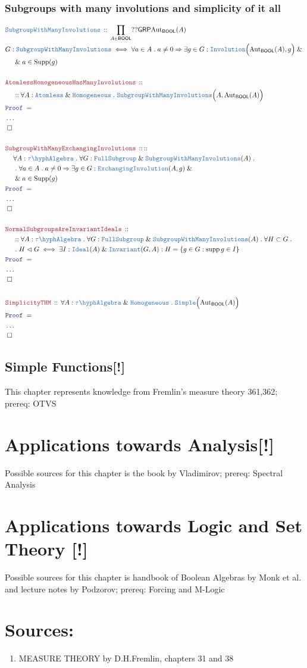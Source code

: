 \documentclass[12pt]{scrartcl}
\newcommand{\TYPE}[1]{\textcolor{NavyBlue}{\mathtt{#1}}}
\newcommand{\LOGIC}[1]{\textcolor{Blue}{\mathtt{#1}}}
\newcommand{\THM}[1]{\textcolor{Maroon}{\mathtt{#1}}}
\renewcommand{\.}{\; . \;}
\newcommand{\Theorem}[2]{& \THM{#1} \, :: \, #2 \\ & \Proof = \\ }
\newcommand{\DeclareType}[2]{& \TYPE{#1} \, :: \, #2 \\}
\newcommand{\DefineType}[3]{& #1 : \TYPE{#2} \iff #3 \\}
\newcommand{\NewLine}{\\ & \kern 1pc}
\newcommand{\Page}[1]{ \begin{align*} #1 \end{align*}   }
\newcommand{\NoProof}{ & \ldots \\ \EndProof}
\renewcommand{\And}{\; \& \;}
\newcommand{\Imply}{\Rightarrow}
\DeclareMathOperator*{\supp}{supp}
\newcommand{\Aut}{\mathrm{Aut}}
\newcommand{\QED}{\; \square}
\newcommand{\EndProof}{& \QED \\}
\newcommand{\Proof}{\LOGIC{Proof} \; }
\newcommand{\Ideal}{\TYPE{Ideal}}
\newcommand{\Nrml}{\vartriangleleft}
\newcommand{\GRP}{\mathsf{GRP}}
\newcommand{\TAlgebra}{\TYPE{\tau\hyph Algebra}}
\newcommand{\Aless}{\TYPE{Atomless}}
\newcommand{\Homog}{\TYPE{Homogeneous}}
\newcommand{\FS}{\TYPE{FullSubgroup}}
\newcommand{\EI}{\TYPE{ExchangingInvolution}}
\newcommand{\SwmI}{\TYPE{SubgroupWithManyInvolutions}}
\DeclareMathOperator{\Supp}{Supp}
\newcommand{\BOOL}{\mathsf{BOOL}}
\begin{document}
\subsubsection{Subgroups with many involutions and simplicity of it all}
\Page{
	\DeclareType{\SwmI}{\prod_{A \in \BOOL} ??\GRP \Aut_\BOOL(A)}
	\DefineType{G}{\SwmI}{
		\forall a \in A \. a \neq 0
		\Imply
		\exists g \in G :
		\TYPE{Involution}\Big(\Aut_\BOOL(A), g \Big) 
		\And \NewLine		
		\And a \in \Supp(g)
	}
	\\
	\Theorem{AtomlessHomogeneousHasManyInvolutions}{
		\NewLine ::		
		\forall A : \Aless \And \Homog \.
		\SwmI\Big(A,\Aut_\BOOL(A)	\Big)
	}
	\NoProof
	\\
	\Theorem{SubgroupWithManyExchangingInvolutions}
	{
		:: \NewLine 		
		\forall A : \TAlgebra \.
		\forall G : \FS\And\SwmI(A) \.
		\NewLine \.
		\forall a \in A \. a \neq 0 
		\Imply 
		\exists g \in G :
		\EI(A, g ) 
		\And \NewLine		
		\And a \in \Supp(g)
	}
	\NoProof
	\\
	\Theorem{
		NormalSubgroupsAreInvariantIdeals	
	}
	{
		\NewLine ::		
		\forall A : \TAlgebra \.
		\forall G : \FS\And\SwmI(A) \. \forall H \subset G \. \NewLine \.
		H \Nrml G
		\iff
		\exists I : \Ideal(A) \And \TYPE{Invariant}(G,A) :
		H = \{ g \in G : \supp g \in I  \}
	}
	\NoProof
	\\
	\Theorem{SimplicityTHM}
	{
		\forall A : \TAlgebra \And \Homog \.
		\TYPE{Simple}\Big( \Aut_\BOOL(A) \Big)
	}
	\NoProof
}
\newpage
\subsection{Simple Functions[!]}
This chapter represents knowledge from Fremlin's measure theory  361,362; prereq: OTVS
\section{Applications towards Analysis[!]}
Possible sources for this chapter is the book by Vladimirov; prereq: Spectral Analysis
\section{Applications towards Logic and Set Theory [!]}
Possible sources for this chapter is handbook of Boolean Algebras by Monk et al. and lecture notes by Podzorov; prereq: Forcing and M-Logic
\newpage 
\section*{Sources:}
\begin{enumerate}
\item MEASURE THEORY by D.H.Fremlin, chapters 31 and 38
\end{enumerate}
\end{document}
